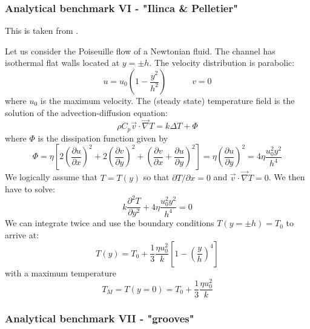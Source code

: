 \subsubsection{Analytical benchmark VI \label{mms6} - "Ilinca \& Pelletier"}
 

This is taken from \cite{ilpe07}.

Let us consider the Poiseuille flow of a Newtonian fluid. The channel has 
isothermal flat walls located at $y=\pm h$. The velocity distribution is parabolic:
\[
u = u_0 \left(1-\frac{y^2}{h^2} \right) 
\quad\quad\quad
v=0
\]
where $u_0$ is the maximum velocity. The (steady state) temperature field is the solution of
the advection-diffusion equation:
\[
\rho C_p \vec v \cdot \vec\nabla T
= k \Delta T + \Phi
\]
where $\Phi$ is the dissipation function given by
\[
\Phi
=\eta \left[  
2\left(\frac{\partial u}{\partial x} \right)^2 + 
2\left(\frac{\partial v}{\partial y} \right)^2 +
\left( \frac{\partial v}{\partial x} + \frac{\partial u}{\partial y} \right)^2
\right]
=
\eta \left( \frac{\partial u}{\partial y} \right)^2 = 4 \eta \frac{u_0^2 y^2}{h^4}
\]
We logically assume that $T=T(y)$ so that $\partial T/\partial x=0$ and $\vec v \cdot \vec\nabla T=0$.
We then have to solve:
\[
k \frac{\partial^2 T}{\partial y^2} + 4 \eta \frac{u_0^2 y^2}{h^4} = 0
\]
We can integrate twice and use the boundary conditions $T(y=\pm h)=T_0$ to arrive at:
\[
T(y) = T_0 + \frac{1}{3} \frac{\eta u_0^2}{k} \left[ 1-\left(\frac{y}{h}\right)^4  \right]
\]
with a maximum temperature
\[
T_M = T(y=0) = T_0 + \frac{1}{3} \frac{\eta u_0^2}{k} 
\]

\subsubsection{Analytical benchmark VII \label{mms7} - "grooves"}

